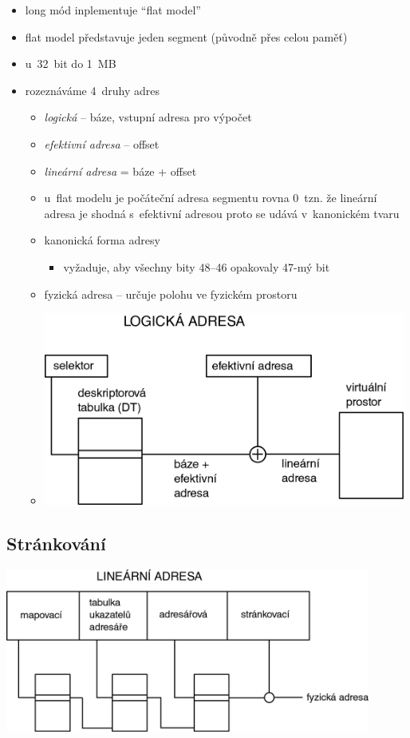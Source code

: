 \documentclass[a4paper,12pt]{article}
\providecommand{\tightlist}{%
\setlength{\itemsep}{0pt}\setlength{\parskip}{0pt}}
\begin{document}
\begin{itemize}
\tightlist
\item long mód inplementuje ``flat model''
\item flat model představuje jeden segment (původně přes celou paměť)
\item u~32~bit do 1~MB
\item rozeznáváme 4~druhy adres

  \begin{itemize}
    \tightlist
  \item \emph{logická} -- báze, vstupní adresa pro výpočet
  \item \emph{efektivní adresa} -- offset
  \item \emph{lineární adresa} = báze + offset
  \item u~flat modelu je počáteční adresa segmentu rovna 0~tzn. že lineární
    adresa je shodná s~efektivní adresou proto se udává v~kanonickém
    tvaru
  \item kanonická forma adresy

    \begin{itemize}
    \tightlist
    \item vyžaduje, aby všechny bity 48--46 opakovaly 47-mý bit
    \end{itemize}
  \item fyzická adresa -- určuje polohu ve fyzickém prostoru
  \item[] \includegraphics[width=11.904cm]{ref/logicka-adresa.png}
  \end{itemize}
\end{itemize}

\subsection{Stránkování}

\includegraphics[width=12cm]{ref/strankovani.png}
\end{document}
